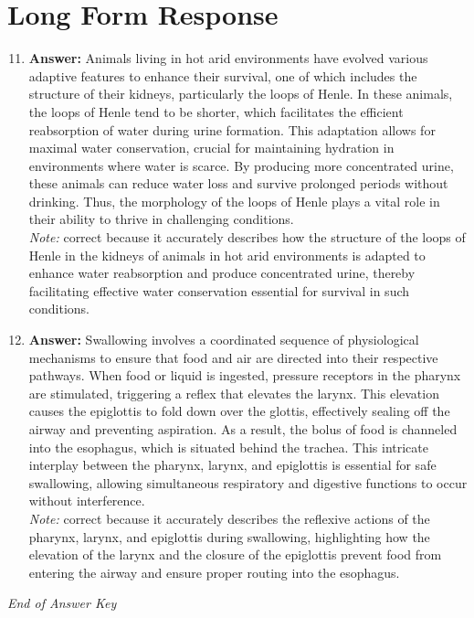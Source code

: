 \documentclass[12pt]{article}
\begin{document}
\section*{Long Form Response}
\begin{enumerate}[label=\arabic*.]
\setcounter{enumi}{10}
\item \textbf{Answer:} Animals living in hot arid environments have evolved various adaptive features to enhance their survival, one of which includes the structure of their kidneys, particularly the loops of Henle. In these animals, the loops of Henle tend to be shorter, which facilitates the efficient reabsorption of water during urine formation. This adaptation allows for maximal water conservation, crucial for maintaining hydration in environments where water is scarce. By producing more concentrated urine, these animals can reduce water loss and survive prolonged periods without drinking. Thus, the morphology of the loops of Henle plays a vital role in their ability to thrive in challenging conditions.
\\ \textit{Note:} correct because it accurately describes how the structure of the loops of Henle in the kidneys of animals in hot arid environments is adapted to enhance water reabsorption and produce concentrated urine, thereby facilitating effective water conservation essential for survival in such conditions.
\item \textbf{Answer:} Swallowing involves a coordinated sequence of physiological mechanisms to ensure that food and air are directed into their respective pathways. When food or liquid is ingested, pressure receptors in the pharynx are stimulated, triggering a reflex that elevates the larynx. This elevation causes the epiglottis to fold down over the glottis, effectively sealing off the airway and preventing aspiration. As a result, the bolus of food is channeled into the esophagus, which is situated behind the trachea. This intricate interplay between the pharynx, larynx, and epiglottis is essential for safe swallowing, allowing simultaneous respiratory and digestive functions to occur without interference.
\\ \textit{Note:} correct because it accurately describes the reflexive actions of the pharynx, larynx, and epiglottis during swallowing, highlighting how the elevation of the larynx and the closure of the epiglottis prevent food from entering the airway and ensure proper routing into the esophagus.
\end{enumerate}

\vfill
\noindent\textit{End of Answer Key}
\end{document}

